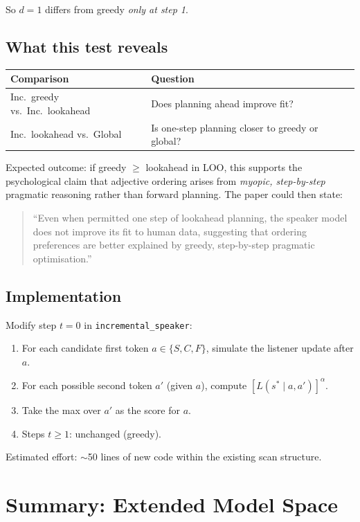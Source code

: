 \documentclass[11pt, a4paper]{article}
\begin{document}
So $d=1$ differs from greedy \emph{only at step 1}.

\subsection{What this test reveals}

\begin{center}
\begin{tabular}{ll}
\toprule
\textbf{Comparison} & \textbf{Question} \\
\midrule
Inc.\ greedy vs.\ Inc.\ lookahead & Does planning ahead improve fit? \\
Inc.\ lookahead vs.\ Global & Is one-step planning closer to greedy or global? \\
\bottomrule
\end{tabular}
\end{center}

Expected outcome: if greedy $\geq$ lookahead in LOO, this supports the psychological claim that adjective ordering arises from \emph{myopic, step-by-step} pragmatic reasoning rather than forward planning.
The paper could then state:

\begin{quote}
``Even when permitted one step of lookahead planning, the speaker model does not improve its fit to human data, suggesting that ordering preferences are better explained by greedy, step-by-step pragmatic optimisation.''
\end{quote}

\subsection{Implementation}

Modify step $t=0$ in \texttt{incremental\_speaker}:
\begin{enumerate}
  \item For each candidate first token $a \in \{S, C, F\}$, simulate the listener update after $a$.
  \item For each possible second token $a'$ (given $a$), compute $[L(s^* \mid a, a')]^\alpha$.
  \item Take the max over $a'$ as the score for $a$.
  \item Steps $t \geq 1$: unchanged (greedy).
\end{enumerate}
Estimated effort: $\sim$50 lines of new code within the existing scan structure.


\section{Summary: Extended Model Space}
\end{document}
